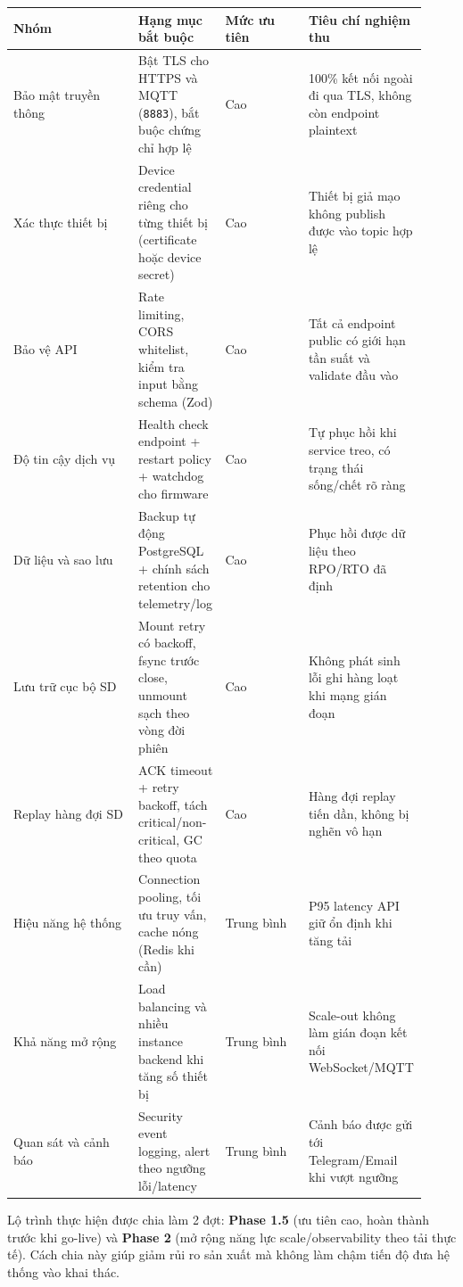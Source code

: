 \documentclass[13pt,a4paper]{extarticle}
\newcounter{none} %
\newcommand{\thesislongtableorignewline}{}
\let\thesislongtableorignewline\\
\renewcommand{\\}{\thesislongtableorignewline\hline}%
\let\\\thesislongtableorignewline
\begin{document}
{\def\LTcaptype{none} %
\begin{longtable}{|p{0.30\linewidth}|p{0.16\linewidth}|p{0.20\linewidth}|p{0.26\linewidth}|}
\hline \textbf{Nhóm} & \textbf{Hạng mục bắt buộc} & \textbf{Mức ưu tiên} & \textbf{Tiêu chí nghiệm thu} \\
\hline
\endhead
\hline
\endlastfoot
Bảo mật truyền thông & Bật TLS cho HTTPS và MQTT (\texttt{8883}), bắt
buộc chứng chỉ hợp lệ & Cao & 100\% kết nối ngoài đi qua TLS, không còn
endpoint plaintext \\
Xác thực thiết bị & Device credential riêng cho từng thiết bị
(certificate hoặc device secret) & Cao & Thiết bị giả mạo không publish
được vào topic hợp lệ \\
Bảo vệ API & Rate limiting, CORS whitelist, kiểm tra input bằng schema
(Zod) & Cao & Tất cả endpoint public có giới hạn tần suất và validate
đầu vào \\
Độ tin cậy dịch vụ & Health check endpoint + restart policy + watchdog
cho firmware & Cao & Tự phục hồi khi service treo, có trạng thái
sống/chết rõ ràng \\
Dữ liệu và sao lưu & Backup tự động PostgreSQL + chính sách retention
cho telemetry/log & Cao & Phục hồi được dữ liệu theo RPO/RTO đã định \\
Lưu trữ cục bộ SD & Mount retry có backoff, fsync trước close, unmount
sạch theo vòng đời phiên & Cao & Không phát sinh lỗi ghi hàng loạt khi
mạng gián đoạn \\
Replay hàng đợi SD & ACK timeout + retry backoff, tách
critical/non-critical, GC theo quota & Cao & Hàng đợi replay tiến dần,
không bị nghẽn vô hạn \\
Hiệu năng hệ thống & Connection pooling, tối ưu truy vấn, cache nóng
(Redis khi cần) & Trung bình & P95 latency API giữ ổn định khi tăng
tải \\
Khả năng mở rộng & Load balancing và nhiều instance backend khi tăng số
thiết bị & Trung bình & Scale-out không làm gián đoạn kết nối
WebSocket/MQTT \\
Quan sát và cảnh báo & Security event logging, alert theo ngưỡng
lỗi/latency & Trung bình & Cảnh báo được gửi tới Telegram/Email khi vượt
ngưỡng \\
\end{longtable}
}

Lộ trình thực hiện được chia làm 2 đợt: \textbf{Phase 1.5} (ưu tiên cao,
hoàn thành trước khi go-live) và \textbf{Phase 2} (mở rộng năng lực
scale/observability theo tải thực tế). Cách chia này giúp giảm rủi ro
sản xuất mà không làm chậm tiến độ đưa hệ thống vào khai thác.
\end{document}
